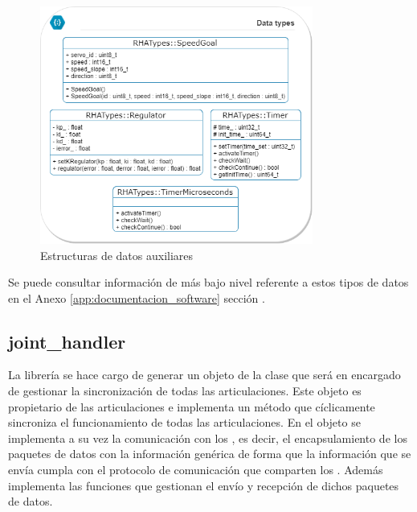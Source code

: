         \begin{figure}[H]
            \centering
            \includegraphics[width=0.8\textwidth]{figuras/Imagenes_SW/class_diagram_TRHA.png}   
            \caption{Estructuras de datos auxiliares}
            \label{fig:SW:class_diagram_TRHA}
        \end{figure}
        
        Se puede consultar información de más bajo nivel referente a estos tipos de datos en el Anexo \ref{app:documentacion_software} sección \completar.
    \subsection{joint\_handler} \label{subsec:SW:lib:joint_handler}
        La librería  se hace cargo de generar un objeto de la clase  que será en encargado de gestionar la sincronización de todas las articulaciones. Este objeto es propietario de las articulaciones e implementa un método que cíclicamente sincroniza el funcionamiento de todas las articulaciones. En el objeto  se implementa a su vez la comunicación con los , es decir, el encapsulamiento de los paquetes de datos con la información genérica de forma que la información que se envía cumpla con el protocolo de comunicación que comparten los . Además implementa las funciones que gestionan el envío y recepción de dichos paquetes de datos.
        

